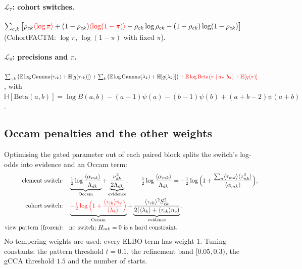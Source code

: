 \documentclass[11pt,a4paper]{article}
\newcommand{\new}[1]{{\color{red}#1}}
\newcommand{\E}{\mathbb{E}}
\newcommand{\Betad}{\mathrm{Beta}}
\newcommand{\Gam}{\mathrm{Gamma}}
\newcommand{\ELBO}{\mathcal{L}}
\theoremstyle{definition}
\theoremstyle{remark}
\begin{document}
\paragraph{$\ELBO_7$: cohort switches.}
$\sum_{c,k}\big[\rho_{ck}\new{\langle\log\pi\rangle}+(1-\rho_{ck})\new{\langle\log(1-\pi)\rangle}-\rho_{ck}\log\rho_{ck}-(1-\rho_{ck})\log(1-\rho_{ck})\big]$
(CohortFACTM: $\log\pi$, $\log(1-\pi)$ with fixed $\pi$).

\paragraph{$\ELBO_8$: precisions \new{and $\pi$}.}
$\sum_{c,k}\big(\E\log\Gam(\tau_{ck})+\mathbb H[q(\tau_{ck})]\big)+\sum_k\big(\E\log\Gam(\lambda_k)+\mathbb H[q(\lambda_k)]\big)
+\new{\E\log\Betad(\pi\mid a_\pi,b_\pi)+\mathbb H[q(\pi)]}$, with
$\mathbb H[\Betad(a,b)]=\log B(a,b)-(a-1)\psi(a)-(b-1)\psi(b)+(a+b-2)\psi(a+b)$.

\subsection{Occam penalties and the other weights}\label{sec:occam}
Optimising the gated parameter out of each paired block splits the switch's log-odds into evidence and an Occam term:
\begin{align}
\text{element switch:}\quad&\underbrace{\tfrac12\log\frac{\langle\alpha_{mk}\rangle}{\Lambda_{dk}}}_{\text{Occam}}+\underbrace{\frac{\nu_{dk}^2}{2\Lambda_{dk}}}_{\text{evidence}},
  \qquad \tfrac12\log\frac{\langle\alpha_{mk}\rangle}{\Lambda_{dk}}=-\tfrac12\log\Big(1+\frac{\sum_n\langle\tau_{md}\rangle\langle z_{nk}^2\rangle}{\langle\alpha_{mk}\rangle}\Big),\\
\text{cohort switch:}\quad&\underbrace{\new{-\tfrac12\log\Big(1+\frac{\langle\tau_{ck}\rangle n_c}{\langle\lambda_k\rangle}\Big)}}_{\text{Occam}}
  +\underbrace{\frac{\langle\tau_{ck}\rangle^2S_{ck}^2}{2(\langle\lambda_k\rangle+\langle\tau_{ck}\rangle n_c)}}_{\text{evidence}},\\
\text{view pattern (frozen):}\quad&\text{no switch; } H_{mk}=0 \text{ is a hard constraint.}\notag
\end{align}
No tempering weights are used: every ELBO term has weight $1$. Tuning constants: the pattern threshold $t=0.1$, the
refinement band $[0.05,0.3)$, the gCCA threshold $1.5$ and the number of starts.
\end{document}
